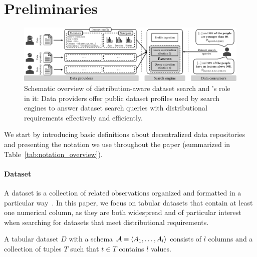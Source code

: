 
\section{Preliminaries}
\label{sec:preliminaries}

\begin{figure}[t]
    \centering
    \includegraphics[scale=1]{figures/diagrams/problem_overview.pdf}
    \caption{
        Schematic overview of distribution-aware dataset search and \system{}'s role in it: Data providers offer public dataset profiles used by search engines to answer dataset search queries with distributional requirements effectively and efficiently.
    }
    \label{fig:problem_overview}
    \vspace{-1em}
\end{figure}

We start by introducing basic definitions about decentralized data repositories and presenting the notation we use throughout the paper (summarized in Table~\ref{tab:notation_overview}).

\paragraph{Dataset}
A dataset is a collection of related observations organized and formatted in a particular way~\cite{chapman_dataset_2020}.
In this paper, we focus on tabular datasets that contain at least one numerical column, as they are both widespread and of particular interest when searching for datasets that meet distributional requirements.

\begin{definition}
    A tabular dataset $D$ with a schema $\mathcal{A} \equiv \langle A_1,\ldots, A_l \rangle$ consists of  $l$ columns and a collection of tuples $T$ such that $t\in T$ contains $l$ values.
\end{definition}

